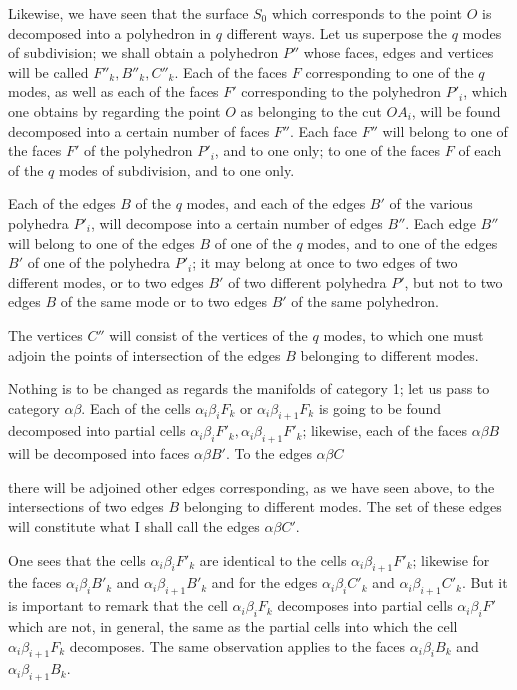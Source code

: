 \documentclass{article}
\begin{document}
Likewise, we have seen that the surface $S_{0}$ which corresponds to the point $O$ is decomposed into a polyhedron in $q$ different ways. Let us superpose the $q$ modes of subdivision; we shall obtain a polyhedron $P''$ whose faces, edges and vertices will be called $F''_{k}, B''_{k}, C''_{k}$. Each of the faces $F$ corresponding to one of the $q$ modes, as well as each of the faces $F'$ corresponding to the polyhedron $P'_{i}$, which one obtains by regarding the point $O$ as belonging to the cut $OA_{i}$, will be found decomposed into a certain number of faces $F''$. Each face $F''$ will belong to one of the faces $F'$ of the polyhedron $P'_{i}$, and to one only; to one of the faces $F$ of each of the $q$ modes of subdivision, and to one only.

Each of the edges $B$ of the $q$ modes, and each of the edges $B'$ of the various polyhedra $P'_{i}$, will decompose into a certain number of edges $B''$. Each edge $B''$ will belong to one of the edges $B$ of one of the $q$ modes, and to one of the edges $B'$ of one of the polyhedra $P'_{i}$; it may belong at once to two edges of two different modes, or to two edges $B'$ of two different polyhedra $P'$, but not to two edges $B$ of the same mode or to two edges $B'$ of the same polyhedron.

The vertices $C''$ will consist of the vertices of the $q$ modes, to which one must adjoin the points of intersection of the edges $B$ belonging to different modes.

Nothing is to be changed as regards the manifolds of category 1; let us pass to category $\alpha\beta$. Each of the cells $\alpha_{i}\beta_{i}F_{k}$ or $\alpha_{i}\beta_{i+1}F_{k}$ is going to be found decomposed into partial cells $\alpha_{i}\beta_{i}F'_{k}, \alpha_{i}\beta_{i+1}F'_{k}$; likewise, each of the faces $\alpha\beta B$ will be decomposed into faces $\alpha\beta B'$. To the edges $\alpha\beta C$

there will be adjoined other edges corresponding, as we have seen above, to the intersections of two edges $B$ belonging to different modes. The set of these edges will constitute what I shall call the edges $\alpha\beta C'$.

One sees that the cells $\alpha_{i}\beta_{i}F'_{k}$ are identical to the cells $\alpha_{i}\beta_{i+1}F'_{k}$; likewise for the faces $\alpha_{i}\beta_{i}B'_{k}$ and $\alpha_{i}\beta_{i+1}B'_{k}$ and for the edges $\alpha_{i}\beta_{i}C'_{k}$ and $\alpha_{i}\beta_{i+1}C'_{k}$. But it is important to remark that the cell $\alpha_{i}\beta_{i}F_{k}$ decomposes into partial cells $\alpha_{i}\beta_{i}F'$ which are not, in general, the same as the partial cells into which the cell $\alpha_{i}\beta_{i+1}F_{k}$ decomposes. The same observation applies to the faces $\alpha_{i}\beta_{i}B_{k}$ and $\alpha_{i}\beta_{i+1}B_{k}$.
\end{document}
